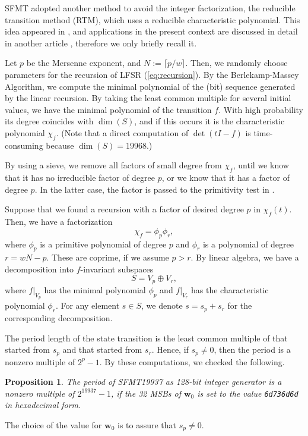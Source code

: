 \documentclass[acmnow]{acmtrans2m}
\newtheorem{proposition}[theorem]{Proposition}
\def\bw{{{\mathbf w}}}
\begin{document}
SFMT adopted
another method to avoid the integer factorization,
the reducible transition method (RTM), 
which uses a reducible characteristic polynomial.
This idea appeared in \cite{FUSHIMI90}
\cite{BRENT}\cite{BRENT-PRIM}, and 
applications in the present context are 
discussed in detail in another article \cite{PMT}, 
therefore we only briefly recall it. 

Let $p$ be the Mersenne exponent, and $N:=\lceil p/w \rceil$.
Then, we randomly choose parameters for the recursion of LFSR
(\ref{eq:recursion}).
By the Berlekamp-Massey Algorithm, 
we compute the minimal polynomial of the (bit) sequence
generated by the linear recursion. By taking the least
common multiple for several initial values, we have the 
minimal polynomial of the transition $f$. With high 
probability its degree coincides with $\dim(S)$, and if 
this occurs it is the characteristic polynomial $\chi_f$. 
(Note that a direct computation of $\det(tI-f)$ is time-consuming
 because $\dim(S)=19968$.)

By using a sieve, we remove all 
factors of small degree from $\chi_f$,
until we know that it has no irreducible factor of degree $p$,
or we know that it has a factor of degree $p$. 
In the latter case, the factor is 
passed to the primitivity test in \cite[\S3.2.2]{knuth:bible}.

Suppose that we found a recursion with a factor of 
desired degree $p$ in $\chi_f(t)$. Then, 
we have a factorization
$$
\chi_f=\phi_p \phi_r,
$$
where $\phi_p$ is a primitive polynomial of degree $p$
and $\phi_r$ is a polynomial of degree $r=wN-p$. These are coprime, 
if we assume $p>r$.
By linear algebra, we have a decomposition into $f$-invariant subspaces
$$
S=V_p \oplus V_r,
$$
where $f|_{V_p}$ has the minimal polynomial $\phi_p$
and $f|_{V_r}$ has the characteristic polynomial $\phi_r$.
For any element $s \in S$, we denote $s=s_p+s_r$ for the corresponding
decomposition. 

The period length of the state transition is the least common multiple
of that started from $s_p$ and that started from $s_r$. Hence, 
if $s_p \neq 0$, then the period is a nonzero multiple of $2^p-1$. 
By these computations, we checked the following. 
\begin{proposition}
The period of SFMT19937 as 128-bit integer generator is 
a nonzero multiple of $2^{19937}-1$, if the 32 MSBs of 
$\bw_0$ is set to 
the value {\tt 6d736d6d} in hexadecimal form.
\end{proposition}
The choice of the value for $\bw_0$ is to assure that $s_p\neq 0$.
\end{document}
